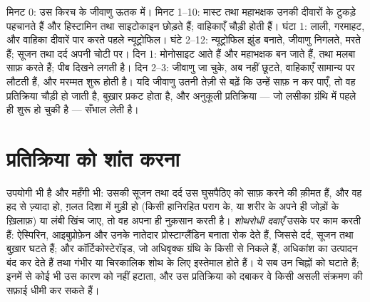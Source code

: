\begin{example}[किसी किरच की समय-सारणी]\label{ex:g12:innate-immunity:timetable}
मिनट 0: उस किरच के जीवाणु ऊतक में। मिनट 1--10: मास्ट  तथा महाभक्षक
उनकी दीवारों के टुकड़े पहचानते हैं और हिस्टामिन तथा साइटोकाइन छोड़ते हैं;
वाहिकाएँ चौड़ी होती हैं। घंटा 1: लाली, गरमाहट, और वाहिका दीवारें पार करते
पहले न्यूट्रोफिल। घंटे 2--12: न्यूट्रोफिल झुंड बनाते, जीवाणु निगलते, मरते
हैं; सूजन तथा दर्द अपनी चोटी पर। दिन 1: मोनोसाइट आते हैं और महाभक्षक बन
जाते हैं, तथा मलबा साफ़ करते हैं; पीब दिखने लगती है। दिन 2--3: जीवाणु जा
चुके,  अब नहीं छूटते, वाहिकाएँ सामान्य पर लौटती हैं, और मरम्मत शुरू
होती है। यदि जीवाणु उतनी तेज़ी से बढ़ें कि  उन्हें साफ़ न कर
पाएँ, तो वह प्रतिक्रिया चौड़ी हो जाती है, बुख़ार प्रकट होता है, और अनुकूली
प्रतिक्रिया --- जो लसीका ग्रंथि में पहले ही शुरू हो चुकी है --- सँभाल लेती है।
\end{example}

\section{प्रतिक्रिया को शांत करना}

\begin{proposition}[शोथरोधी दवाएँ]\label{prop:g12:innate-immunity:drugs}
 उपयोगी भी है और महँगी भी: उसकी सूजन तथा दर्द उस घुसपैठिए को
साफ़ करने की क़ीमत हैं, और वह हद से ज़्यादा हो, ग़लत दिशा में मुड़ी हो
(किसी हानिरहित पराग के, या शरीर के अपने ही जोड़ों के ख़िलाफ़) या लंबी खिंच
जाए, तो वह अपना ही नुक़सान करती है। \emph{शोथरोधी
दवाएँ} उसके  पर काम करती हैं: ऐस्पिरिन,
आइबुप्रोफ़ेन और उनके नातेदार प्रोस्टाग्लैंडिन बनाता  रोक देते हैं,
जिससे दर्द, सूजन तथा बुख़ार घटते हैं; और कॉर्टिकोस्टेरॉइड, जो अधिवृक्क
ग्रंथि के किसी  से निकले हैं, अधिकांश  का उत्पादन बंद कर
देते हैं तथा गंभीर या चिरकालिक शोथ के लिए इस्तेमाल होते हैं। ये सब उन
चिह्नों को घटाते हैं; इनमें से कोई भी उस कारण को नहीं हटाता, और उस
प्रतिक्रिया को दबाकर वे किसी असली संक्रमण की सफ़ाई धीमी कर सकते हैं।
\end{proposition}
\admitted

